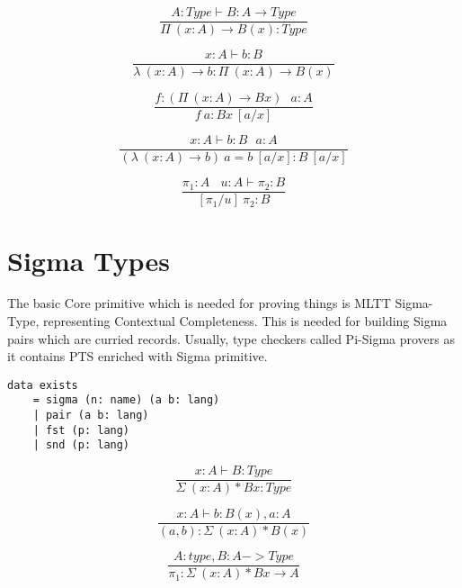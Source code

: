 \documentclass{article}
\begin{document}
\begin{equation}
\tag{$\Pi$-formation}
\dfrac
{A : Type \vdash B : A \rightarrow Type}
{\Pi\ (x:A) \rightarrow B(x) : Type}
\end{equation}

\begin{equation}
\tag{$\lambda$-intro}
\dfrac
{x:A \vdash b : B}
{\lambda\ (x:A) \rightarrow b : \Pi\ (x:A) \rightarrow B(x) }
\end{equation}

\begin{equation}
\tag{$App$-elimination}
\dfrac
{f: (\Pi\ (x:A) \rightarrow B x)\ \ \ a: A}
{f\ a : B x\ [a/x]}
\end{equation}

\begin{equation}
\tag{$\beta$-computation}
\dfrac
{x:A \vdash b: B\ \ \ a:A}
{(\lambda\ (x:A) \rightarrow b)\ a = b\ [a/x] : B\ [a/x]}
\end{equation}

\begin{equation}
\tag{subst}
\dfrac
{\pi_1 : A\ \ \ \ u:A \vdash \pi_2 : B}
{[\pi_1/u]\ \pi_2 : B}
\end{equation}

\section{Sigma Types}

The basic Core primitive which is needed for proving things
is MLTT Sigma-Type, representing Contextual Completeness.
This is needed for building Sigma pairs which are curried
records. Usually, type checkers called Pi-Sigma provers
as it contains PTS enriched with Sigma primitive.

\begin{lstlisting}[mathescape=true]
data exists
    = sigma (n: name) (a b: lang)
    | pair (a b: lang)
    | fst (p: lang)
    | snd (p: lang)
\end{lstlisting}

\begin{equation}
\tag{$\Sigma$-formation}
\dfrac
{x:A \vdash B : Type}
{\Sigma\ (x:A) * B x : Type}
\end{equation}

\begin{equation}
\tag{$\Sigma$-intro}
\dfrac
{x:A \vdash b : B(x), a: A}
{(a,b) : \Sigma\ (x:A) * B(x) }
\end{equation}

\begin{equation}
\tag{$\pi_1$-elimination}
\dfrac
{A: type, B: A -> Type}
{\pi_1 : \Sigma\ (x:A) * B x \rightarrow A}
\end{equation}
\end{document}
